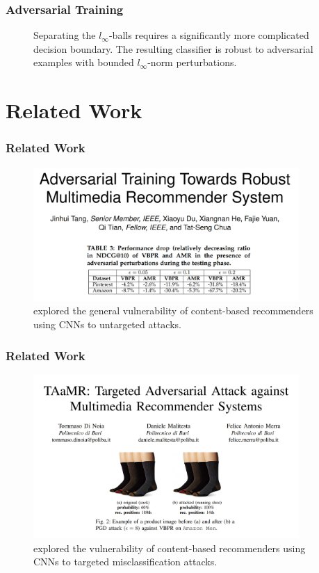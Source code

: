 \documentclass{beamer}
\begin{document}
	\begin{frame}
		\frametitle{Adversarial Training}
		\begin{figure}[H]
			\centering
			
			\caption{Separating the $l_\infty$-balls requires a significantly more complicated decision boundary. The resulting classifier is robust to adversarial examples with bounded $l_\infty$-norm perturbations.}
		\end{figure}
	\end{frame}
	
	\section{Related Work}
	\begin{frame}
		\frametitle{Related Work}
		\begin{figure}[H]
			\centering
			\includegraphics[width=0.9\textwidth]{images/amr}
			\caption{\cite{tang2019adversarial} explored the general vulnerability of content-based recommenders using CNNs to untargeted attacks.}
			\label{fig:related-work}
		\end{figure}
	\end{frame}
	
	\begin{frame}
		\frametitle{Related Work}
		\begin{figure}[H]
			\centering
			
			\includegraphics[width=0.9\textwidth]{images/tamr}
			\caption{\cite{di2020taamr} explored the vulnerability of content-based recommenders using CNNs to targeted misclassification attacks.}
			\label{fig:related-work}
		\end{figure}
	\end{frame}
	
\end{document}
